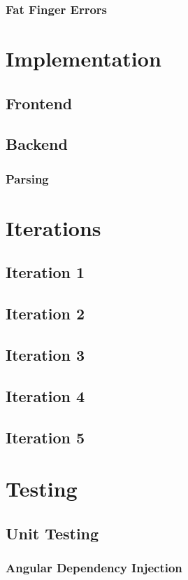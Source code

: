 \documentclass[12pt]{article}
\begin{document}
    \subsubsection{Fat Finger Errors}
\newpage
\section{Implementation}
  \subsection{Frontend}
  \subsection{Backend}
    \subsubsection{Parsing}
\section{Iterations}
  \subsection{Iteration 1}
  \subsection{Iteration 2}
  \subsection{Iteration 3}
  \subsection{Iteration 4}
  \subsection{Iteration 5}
\section{Testing}
  \subsection{Unit Testing}
    \subsubsection{Angular Dependency Injection}
\end{document}
